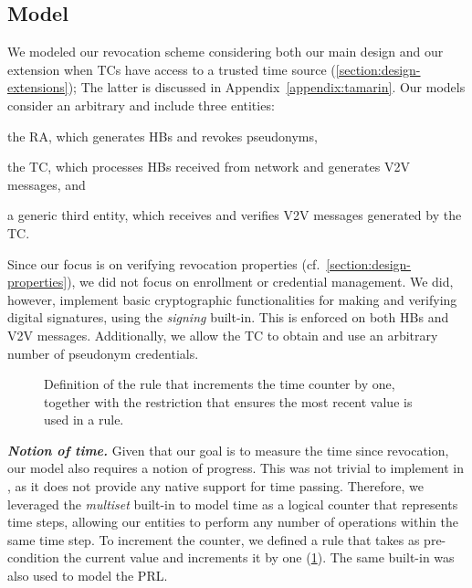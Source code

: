 \subsection{Model}
\label{section:tamarin-model}

We modeled our revocation scheme considering both our main design and our
extension when \acp{TC} have access to a trusted time source
(\cref{section:design-extensions}); The latter is discussed in
Appendix~\ref{appendix:tamarin}. Our models consider an arbitrary \paramtt{} and
include three entities: %
%
\begin{inparaenum}
    \item the \ac{RA}, which generates \acp{HB} and revokes pseudonyms,
    \item the \ac{TC}, which processes \acp{HB} received from network and
    generates \ac{V2V} messages, and
    \item a generic third entity, which receives and verifies \ac{V2V} messages
    generated by the \ac{TC}.
\end{inparaenum}
%
Since our focus is on verifying revocation properties
(cf.~\cref{section:design-properties}), we did not focus on enrollment or
credential management. We did, however, implement basic cryptographic
functionalities for making and verifying digital signatures, using the
\emph{signing} built-in. This is enforced on both \acp{HB} and \ac{V2V}
messages. Additionally, we allow the \ac{TC} to obtain and use an arbitrary
number of pseudonym credentials.

\begin{figure}
  \centering
    
  \caption{Definition of the  rule that increments the
  time counter by one, together with the  restriction
  that ensures the most recent value is used in a rule.}
  \label{listing:tamarin-time}
\end{figure}

\noindent\textbf{\emph{Notion of time.}}
%
Given that our goal is to measure the time since revocation, our model also
requires a notion of progress. This was not trivial to implement in \tamarin, as
it does not provide any native support for time passing. Therefore, we leveraged
the \emph{multiset} built-in to model time as a logical counter that represents
time steps, allowing our entities to perform any number of operations within the
same time step. To increment the counter, we defined a rule that takes as
pre-condition the current value and increments it by one
(\cref{listing:tamarin-time}). The same built-in was also used to model the
\ac{PRL}.

